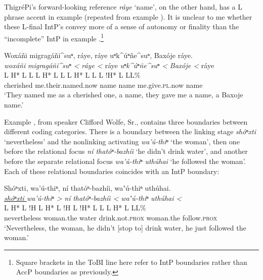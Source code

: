 \documentclass[output=paper]{LSP/langsci}
\begin{document}
ThigréPi’s forward-looking reference \emph{ráye} `name', on the other hand, has a L phrase accent in example  (repeated from example ). It is unclear to me whether these L-final IntP’s convey more of a sense of autonomy or finality than the “incomplete” IntP in example .\footnote{Square brackets in the ToBI line here refer to IntP boundaries rather than AccP boundaries as previously.}

\ea\label{thigrepirayerept}
Woxáñi migragáñi\^{}suⁿ, ráye, ráye uⁿk\^{}úⁿñe\^{}suⁿ, Baxóje ráye.\footnotemark\\
\glll	\emph{woxáñi} 	\emph{migragáñi\^{}suⁿ <}		\emph{ráye <}	ráye		\emph{uⁿk\^{}úⁿñe\^{}suⁿ <}	\emph{Baxóje <}		ráye\\
	{\ob L H* L}		{L\cb}	{\ob L H* L L\cb}	{\ob L H* L}	{L\cb}	{\ob L !H* L} 		{L\cb{}L\%}\\
	cherished		me.their.named.now			name			name		me.give.\textsc{pl}.now						name\\
\glt	`They named me as a cherished one, a name, they gave me a name, a Baxoje name.'
\z

Example , from  speaker Clifford Wolfe, Sr., contains three boundaries between different coding categories. There is a boundary between the linking stage  \emph{shóⁿxti} `nevertheless' and the nonlinking activating  \emph{wa’ú-thiⁿ} `the woman', then one before the relational focus \emph{ní thatóⁿ-bazhíi} `he didn’t drink water', and another before the separate relational focus \emph{wa’ú-thiⁿ uthúhai} `he followed the woman'. Each of these relational boundaries coincides with an IntP boundary:

\ea\label{wolfeintp}
 	Shóⁿxti, wa’ú-thiⁿ, ní thatóⁿ-bazhíi, waʼú-thiⁿ uthúhai.\footnotemark\\
\glll	\emph{\underline{shóⁿxti }}	\emph{wa’ú-thiⁿ >}		\emph{ní} 		\emph{thatóⁿ-bazhíi <}		\emph{waʼú-thiⁿ} 	\emph{uthúhai <}\\
	{\ob L H* L !H\cb}			{\ob L H* L !H\cb}		{\ob L}		{!H* L L\cb}	{\ob L H* L}		{L\cb{}L\%}\\
	nevertheless				woman.the			water			drink.not.\textsc{prox} 		woman.the		follow.\textsc{prox}\\
\glt	`Nevertheless, the woman, he didn’t [stop to] drink water, he just followed the woman.' 
\z
\end{document}
